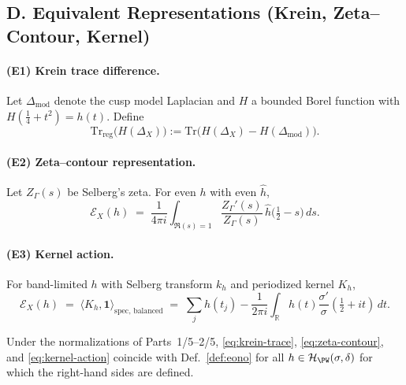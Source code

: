 
\subsection*{D. Equivalent Representations (Krein, Zeta–Contour, Kernel)}
\label{subsec:equivalences}

\paragraph{(E1) Krein trace difference.}
Let $\Delta_{\mathrm{mod}}$ denote the cusp model Laplacian and $H$ a bounded Borel function with $H(\tfrac14+t^2)=h(t)$. Define
\begin{equation}
\label{eq:krein-trace}
 \mathrm{Tr}_{\mathrm{reg}}\!\big(H(\Delta_X)\big)
 := \mathrm{Tr}\!\big(H(\Delta_X)-H(\Delta_{\mathrm{mod}})\big).
\end{equation}
\paragraph{(E2) Zeta–contour representation.}
Let $Z_\Gamma(s)$ be Selberg’s zeta. For even $h$ with even $\hat h$,
\begin{equation}
\label{eq:zeta-contour}
  \mathcal E_X(h) \;=\; \frac{1}{4\pi i}\int_{\Re(s)=1}
     \frac{Z_\Gamma'(s)}{Z_\Gamma(s)}\,\hat h\!\Big(\tfrac12-s\Big)\,ds.
\end{equation}
\paragraph{(E3) Kernel action.}
For band-limited $h$ with Selberg transform $k_h$ and periodized kernel $K_h$,
\begin{equation}
\label{eq:kernel-action}
 \mathcal E_X(h)\;=\;\langle K_h,\mathbf 1\rangle_{\mathrm{spec,\,balanced}}
 \;=\; \sum_j h(t_j) - \frac{1}{2\pi i}\int_{\mathbb R} h(t)\frac{\sigma'}{\sigma}(\tfrac12+it)\,dt.
\end{equation}

\begin{theorem}[Equivalence of (E1)–(E3)]
\label{thm:equivalence}
Under the normalizations of Parts~1/5–2/5, \eqref{eq:krein-trace}, \eqref{eq:zeta-contour}, and \eqref{eq:kernel-action} coincide with Def.~\ref{def:eono} for all $h\in\mathcal H_{\PW}(\sigma,\delta)$ for which the right-hand sides are defined.
\end{theorem}

